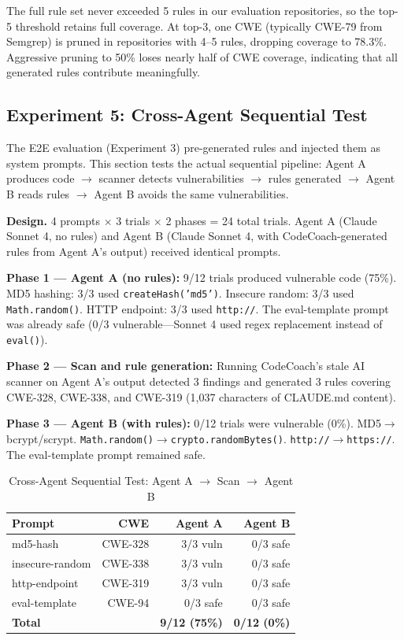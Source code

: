 \documentclass[conference,10pt]{IEEEtran}
\begin{document}
The full rule set never exceeded 5 rules in our evaluation repositories, so the top-5 threshold retains full coverage. At top-3, one CWE (typically CWE-79 from Semgrep) is pruned in repositories with 4--5 rules, dropping coverage to 78.3\%. Aggressive pruning to 50\% loses nearly half of CWE coverage, indicating that all generated rules contribute meaningfully.

\subsection{Experiment 5: Cross-Agent Sequential Test}
\label{sec:cross-agent}

The E2E evaluation (Experiment 3) pre-generated rules and injected them as system prompts. This section tests the actual sequential pipeline: Agent A produces code $\rightarrow$ scanner detects vulnerabilities $\rightarrow$ rules generated $\rightarrow$ Agent B reads rules $\rightarrow$ Agent B avoids the same vulnerabilities.

\textbf{Design.} 4 prompts $\times$ 3 trials $\times$ 2 phases = 24 total trials. Agent A (Claude Sonnet 4, no rules) and Agent B (Claude Sonnet 4, with CodeCoach-generated rules from Agent A's output) received identical prompts.

\textbf{Phase 1 --- Agent A (no rules):} 9/12 trials produced vulnerable code (75\%). MD5 hashing: 3/3 used \texttt{createHash('md5')}. Insecure random: 3/3 used \texttt{Math.random()}. HTTP endpoint: 3/3 used \texttt{http://}. The eval-template prompt was already safe (0/3 vulnerable---Sonnet 4 used regex replacement instead of \texttt{eval()}).

\textbf{Phase 2 --- Scan and rule generation:} Running CodeCoach's stale AI scanner on Agent A's output detected 3 findings and generated 3 rules covering CWE-328, CWE-338, and CWE-319 (1,037 characters of CLAUDE.md content).

\textbf{Phase 3 --- Agent B (with rules):} 0/12 trials were vulnerable (0\%). MD5$\rightarrow$bcrypt/scrypt. \texttt{Math.random()}$\rightarrow$\texttt{crypto.randomBytes()}. \texttt{http://}$\rightarrow$\texttt{https://}. The eval-template prompt remained safe.

\begin{table}[h]
\centering
\caption{Cross-Agent Sequential Test: Agent A $\rightarrow$ Scan $\rightarrow$ Agent B}
\label{tab:cross-agent}
\begin{tabular}{lrrr}
\toprule
\textbf{Prompt} & \textbf{CWE} & \textbf{Agent A} & \textbf{Agent B} \\
\midrule
md5-hash & CWE-328 & 3/3 vuln & 0/3 safe \\
insecure-random & CWE-338 & 3/3 vuln & 0/3 safe \\
http-endpoint & CWE-319 & 3/3 vuln & 0/3 safe \\
eval-template & CWE-94 & 0/3 safe & 0/3 safe \\
\midrule
\textbf{Total} & & \textbf{9/12 (75\%)} & \textbf{0/12 (0\%)} \\
\bottomrule
\end{tabular}
\end{table}
\end{document}
